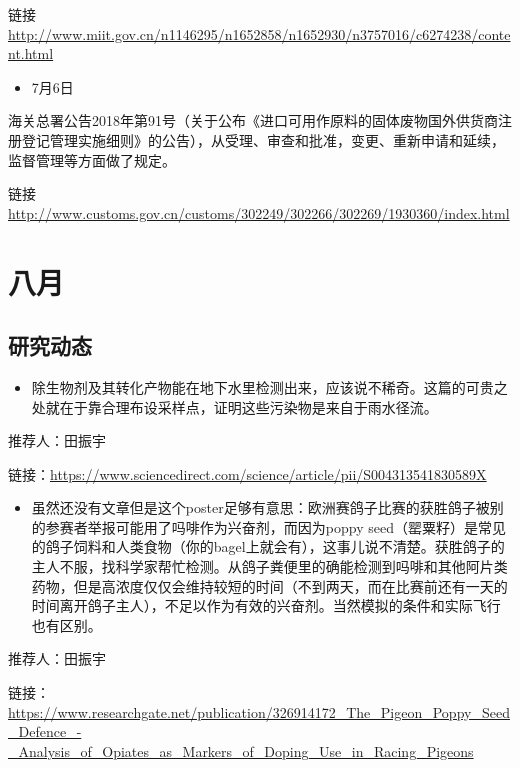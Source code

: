 \documentclass[]{book}
\providecommand{\tightlist}{%
  \setlength{\itemsep}{0pt}\setlength{\parskip}{0pt}}
\begin{document}
链接
\url{http://www.miit.gov.cn/n1146295/n1652858/n1652930/n3757016/c6274238/content.html}

\begin{itemize}
\tightlist
\item
  7月6日
\end{itemize}

海关总署公告2018年第91号（关于公布《进口可用作原料的固体废物国外供货商注册登记管理实施细则》的公告），从受理、审查和批准，变更、重新申请和延续，监督管理等方面做了规定。

链接
\url{http://www.customs.gov.cn/customs/302249/302266/302269/1930360/index.html}

\section*{八月}

\subsection*{研究动态}\label{-9}

\begin{itemize}
\tightlist
\item
  除生物剂及其转化产物能在地下水里检测出来，应该说不稀奇。这篇的可贵之处就在于靠合理布设采样点，证明这些污染物是来自于雨水径流。
\end{itemize}

推荐人：田振宇

链接：\url{https://www.sciencedirect.com/science/article/pii/S004313541830589X}

\begin{itemize}
\tightlist
\item
  虽然还没有文章但是这个poster足够有意思：欧洲赛鸽子比赛的获胜鸽子被别的参赛者举报可能用了吗啡作为兴奋剂，而因为poppy
  seed（罂粟籽）是常见的鸽子饲料和人类食物（你的bagel上就会有），这事儿说不清楚。获胜鸽子的主人不服，找科学家帮忙检测。从鸽子粪便里的确能检测到吗啡和其他阿片类药物，但是高浓度仅仅会维持较短的时间（不到两天，而在比赛前还有一天的时间离开鸽子主人），不足以作为有效的兴奋剂。当然模拟的条件和实际飞行也有区别。
\end{itemize}

推荐人：田振宇

链接：\url{https://www.researchgate.net/publication/326914172_The_Pigeon_Poppy_Seed_Defence_-_Analysis_of_Opiates_as_Markers_of_Doping_Use_in_Racing_Pigeons}
\end{document}
